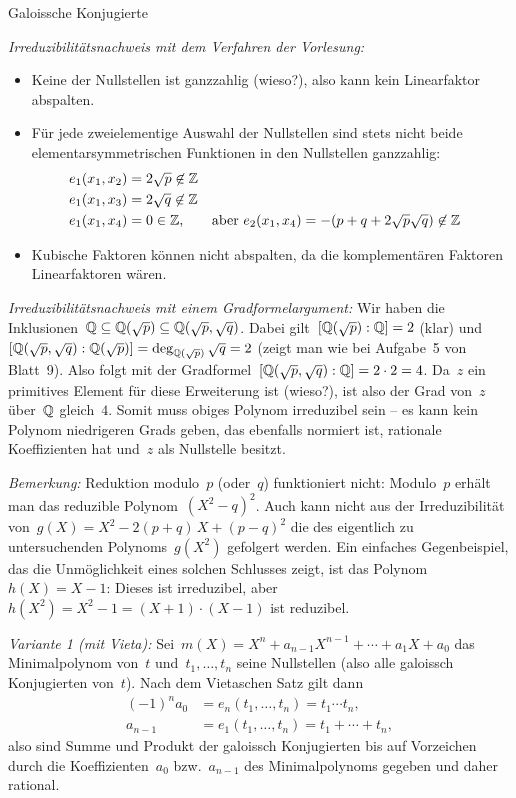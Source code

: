 \documentclass{algblatt}
\begin{document}
\begin{aufgabe}{Galoissche Konjugierte}
\begin{loesungE}
\emph{Irreduzibilitätsnachweis mit dem Verfahren der Vorlesung:}
\begin{itemize}
\item Keine der Nullstellen ist ganzzahlig (wieso?), also
kann kein Linearfaktor abspalten.

\item Für jede zweielementige Auswahl der Nullstellen
sind stets nicht beide elementarsymmetrischen Funktionen in den Nullstellen
ganzzahlig:
\begin{align*}
  e_1(x_1,x_2) &= 2\sqrt{p} \not\in \mathbb{Z} \\
  e_1(x_1,x_3) &= 2\sqrt{q} \not\in \mathbb{Z} \\
  e_1(x_1,x_4) &= 0 \in \mathbb{Z}, & \text{aber } e_2(x_1,x_4) &= -(p+q+2\sqrt{p}\sqrt{q}) \not\in \mathbb{Z}
\end{align*}

\item Kubische Faktoren können nicht abspalten, da die
komplementären Faktoren Linearfaktoren wären.
\end{itemize}

\emph{Irreduzibilitätsnachweis mit einem Gradformelargument:}
Wir haben die Inklusionen~$\mathbb{Q} \subseteq \mathbb{Q}(\sqrt{p}) \subseteq
\mathbb{Q}(\sqrt{p},\sqrt{q})$. Dabei gilt~$[\mathbb{Q}(\sqrt{p}):\mathbb{Q}] = 2$ (klar)
und~$[\mathbb{Q}(\sqrt{p},\sqrt{q}):\mathbb{Q}(\sqrt{p})] = \deg_{\mathbb{Q}(\sqrt{p})}
\sqrt{q} = 2$ (zeigt man wie bei Aufgabe~5 von Blatt~9). Also folgt mit der
Gradformel~$[\mathbb{Q}(\sqrt{p},\sqrt{q}):\mathbb{Q}] = 2 \cdot 2 = 4$.
Da~$z$ ein primitives Element für diese Erweiterung ist
(wieso?), ist also der Grad von~$z$ über~$\mathbb{Q}$ gleich~$4$. Somit muss obiges
Polynom irreduzibel sein -- es kann kein Polynom niedrigeren Grads geben, das
ebenfalls normiert ist, rationale Koeffizienten hat und~$z$ als Nullstelle
besitzt.

\emph{Bemerkung:} Reduktion modulo~$p$ (oder~$q$) funktioniert nicht:
Modulo~$p$ erhält man das reduzible Polynom~$(X^2 - q)^2$. Auch kann nicht aus
der Irreduzibilität von~$g(X) = X^2 - 2(p+q)\,X + (p-q)^2$ die des eigentlich
zu untersuchenden Polynoms~$g(X^2)$ gefolgert werden. Ein einfaches
Gegenbeispiel, das die Unmöglichkeit eines solchen Schlusses zeigt, ist das
Polynom~$h(X) = X - 1$: Dieses ist irreduzibel, aber~$h(X^2) = X^2 - 1 = (X+1)
\cdot (X-1)$ ist reduzibel.

\item \emph{Variante 1 (mit Vieta):}
Sei~$m(X) = X^n + a_{n-1}X^{n-1} + \cdots + a_1 X + a_0$ das
Minimalpolynom von~$t$ und~$t_1,\ldots,t_n$ seine Nullstellen (also alle
galoissch Konjugierten von~$t$). Nach dem Vietaschen Satz gilt dann
\begin{align*}
  (-1)^n a_0 &= e_n(t_1,\ldots,t_n) = t_1 \cdots t_n, \\
  a_{n-1} &= e_1(t_1,\ldots,t_n) = t_1 + \cdots + t_n,
\end{align*}
also sind Summe und Produkt der galoissch Konjugierten bis auf Vorzeichen durch
die Koeffizienten~$a_0$ bzw.~$a_{n-1}$ des Minimalpolynoms gegeben und daher
rational.


\end{loesungE}
\end{aufgabe}
\end{document}
